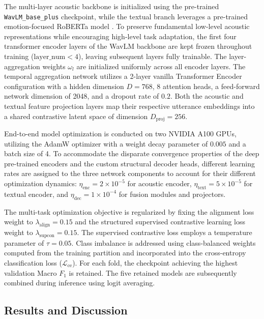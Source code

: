 The multi-layer acoustic backbone is initialized using the pre-trained \texttt{WavLM\_base\_plus} \cite{chen2022wavlm} checkpoint, while the textual branch leverages a pre-trained emotion-focused RoBERTa model \cite{liu2019roberta}. To preserve fundamental low-level acoustic representations while encouraging high-level task adaptation, the first four transformer encoder layers of the WavLM backbone are kept frozen throughout training ($\text{layer\_num} < 4$), leaving subsequent layers fully trainable. The layer-aggregation weights $\omega_l$ are initialized uniformly across all encoder layers. The temporal aggregation network utilizes a 2-layer vanilla Transformer Encoder configuration with a hidden dimension $D = 768$, 8 attention heads, a feed-forward network dimension of 2048, and a dropout rate of $0.2$. Both the acoustic and textual feature projection layers map their respective utterance embeddings into a shared contrastive latent space of dimension $D_{\text{proj}} = 256$.

End-to-end model optimization is conducted on two NVIDIA A100 GPUs, utilizing the AdamW optimizer \cite{Loshchilov2017} with a weight decay parameter of $0.005$ and a batch size of 4. To accommodate the disparate convergence properties of the deep pre-trained encoders and the custom structural decoder heads, different learning rates are assigned to the three network components to account for their different optimization dynamics: $\eta_{\text{enc}} = 2 \times 10^{-5}$ for acoustic encoder, $\eta_{\text{text}} = 5 \times 10^{-5}$ for textual encoder, and $\eta_{\text{dec}} = 1 \times 10^{-4}$ for fusion modules and projectors. 

The multi-task optimization objective is regularized by fixing the alignment loss weight to $\lambda_{\text{align}} = 0.15$ and the structured supervised contrastive learning loss weight to $\lambda_{\text{supcon}} = 0.15$. The supervised contrastive loss employs a temperature parameter of $\tau = 0.05$. Class imbalance is addressed using class-balanced weights computed from the training partition and incorporated into the cross-entropy classification loss ($\mathcal{L}_{\text{ce}}$). For each fold, the checkpoint achieving the highest validation Macro $F_1$ is retained. The five retained models are subsequently combined during inference using logit averaging.

\subsection{Results and Discussion}

